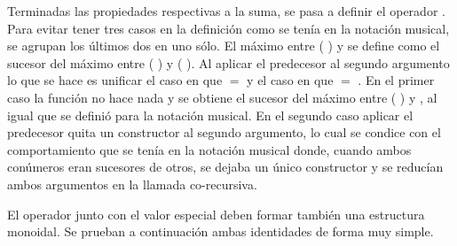 Terminadas las propiedades respectivas a la suma, se pasa a definir el operador . Para evitar tener tres casos en la definición como se tenía en la notación musical, se agrupan los últimos dos en uno sólo. El máximo entre ( ) y  se define como el sucesor del máximo entre ( ) y ( ). Al aplicar el predecesor al segundo argumento lo que se hace es unificar el caso en que  $=$  y el caso en que  $=$  . En el primer caso la función  no hace nada y se obtiene el sucesor del máximo entre ( ) y , al igual que se definió para la notación musical. En el segundo caso aplicar el predecesor quita un constructor  al segundo argumento, lo cual se condice con el comportamiento que se tenía en la notación musical donde, cuando ambos conúmeros eran sucesores de otros, se dejaba un único constructor  y se reducían ambos argumentos en la llamada co-recursiva.

El operador  junto con el valor especial  deben formar también una estructura monoidal. Se prueban a continuación ambas identidades de forma muy simple. 

